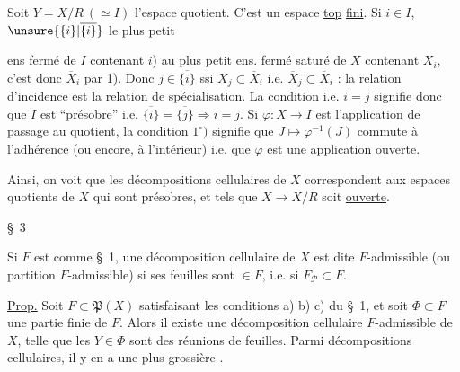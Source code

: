 Soit $Y=X/R\ (\simeq I)$ l'espace quotient. C'est un espace \uline{top} \uline{fini}.  Si $i\in I$, $\unsure{\{i\}|\overline{\{i\}}}$ le plus petit



ens fermé de $I$ contenant $i$)  au plus petit ens. fermé \uline{saturé} de $X$ contenant $X_i$, c'est donc $\overline X_i$ par 1). Donc $j\in\overline{\{i\}}$ ssi $X_j\subset\overline X_i$ i.e. $\overline X_j\subset\overline X_i$ : la relation d'incidence est la relation de spécialisation. La condition  i.e. $i=j$ \uline{signifie} donc que $I$ est ``présobre''  i.e. $\overline{\{i\}}=\overline{\{j\}}\Longrightarrow i=j$. Si $\varphi:X\to I$ est l'application de passage au quotient, la condition $1^\circ)$ \uline{signifie} que $J\mapsto\varphi^{-1}(J)$ commute à l'adhérence (ou encore, à l'intérieur) i.e. que $\varphi$ est une application \uline{ouverte}.

Ainsi, on voit que les décompositions cellulaires  de $X$ correspondent aux  espaces quotients  de $X$ qui sont présobres, et tels que $X\to X/R$ soit \uline{ouverte}.

\S\ 3  

Si $F$ est comme  \S\ 1, une décomposition cellulaire de $X$ est dite $F$-admissible (ou partition $F$-admissible) si ses feuilles sont $\in F$, i.e. si $F_{\mathcal P}\subset F$.




\uline{Prop.}  Soit $F\subset\mathfrak P(X)$ satisfaisant les conditions a) b) c)  du \S\ 1, et soit $\Phi\subset F$ une partie finie de $F$. Alors il existe une décomposition cellulaire $F$-admissible de $X$, telle que les $Y\in\Phi$ sont des réunions de feuilles. Parmi  décompositions cellulaires, il y en a une plus  grossière .


